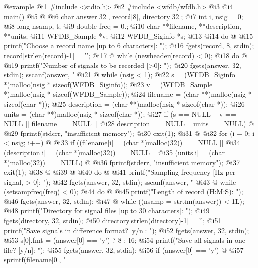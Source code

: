 {{{{{{{{{{@example
  @i{1}  #include <stdio.h>
  @i{2}  #include <wfdb/wfdb.h>
  @i{3}  
  @i{4}  main()
  @i{5}  @{
  @i{6}      char answer[32], record[8], directory[32];
  @i{7}      int i, nsig = 0;
  @i{8}      long nsamp, t;
  @i{9}      double freq = 0.;
 @i{10}      char **filename, **description, **units;
 @i{11}      WFDB_Sample *v;
 @i{12}      WFDB_Siginfo *s;
 @i{13}  
 @i{14}      do @{
 @i{15}          printf("Choose a record name [up to 6 characters]: ");
 @i{16}          fgets(record, 8, stdin); record[strlen(record)-1] = '\0';
 @i{17}      @} while (newheader(record) < 0);
 @i{18}      do @{
 @i{19}          printf("Number of signals to be recorded [>0]: ");
 @i{20}          fgets(answer, 32, stdin); sscanf(answer, "%
 @i{21}      @} while (nsig < 1);
 @i{22}      s = (WFDB_Siginfo *)malloc(nsig * sizeof(WFDB_Siginfo));
 @i{23}      v = (WFDB_Sample *)malloc(nsig * sizeof(WFDB_Sample));
 @i{24}      filename = (char **)malloc(nsig * sizeof(char *));
 @i{25}      description = (char **)malloc(nsig * sizeof(char *));
 @i{26}      units = (char **)malloc(nsig * sizeof(char *));
 @i{27}      if (s == NULL || v == NULL || filename == NULL ||
 @i{28}          description == NULL || units == NULL) @{
 @i{29}          fprintf(stderr, "insufficient memory\n");
 @i{30}          exit(1);
 @i{31}      @}
 @i{32}      for (i = 0; i < nsig; i++) @{
 @i{33}          if ((filename[i] = (char *)malloc(32)) == NULL ||
 @i{34}              (description[i] = (char *)malloc(32)) == NULL ||
 @i{35}              (units[i] = (char *)malloc(32)) == NULL) @{
 @i{36}              fprintf(stderr, "insufficient memory\n");
 @i{37}              exit(1);
 @i{38}          @}
 @i{39}      @}
 @i{40}      do @{
 @i{41}          printf("Sampling frequency [Hz per signal, > 0]: ");
 @i{42}          fgets(answer, 32, stdin); sscanf(answer, "%
 @i{43}      @} while (setsampfreq(freq) < 0);
 @i{44}      do @{
 @i{45}          printf("Length of record (H:M:S): ");
 @i{46}          fgets(answer, 32, stdin);
 @i{47}      @} while ((nsamp = strtim(answer)) < 1L);
 @i{48}      printf("Directory for signal files [up to 30 characters]: ");
 @i{49}      fgets(directory, 32, stdin);
 @i{50}      directory[strlen(directory)-1] = '\0';
 @i{51}      printf("Save signals in difference format? [y/n]: ");
 @i{52}      fgets(answer, 32, stdin);
 @i{53}      s[0].fmt = (answer[0] == 'y') ? 8 : 16;
 @i{54}      printf("Save all signals in one file? [y/n]: ");
 @i{55}      fgets(answer, 32, stdin);
 @i{56}      if (answer[0] == 'y') @{
 @i{57}          sprintf(filename[0], "%
}}}}}}}}}}}}
